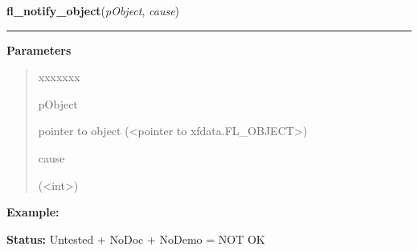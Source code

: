     \label{xformslib:library:fl_notify_object}

    \vspace{0.5ex}

\hspace{.8\funcindent}\begin{boxedminipage}{\funcwidth}

    \raggedright \textbf{fl\_notify\_object}(\textit{pObject}, \textit{cause})

    \vspace{-1.5ex}

    \rule{\textwidth}{0.5\fboxrule}
\setlength{\parskip}{2ex}
\setlength{\parskip}{1ex}
      \textbf{Parameters}
      \vspace{-1ex}

      \begin{quote}
        \begin{Ventry}{xxxxxxx}

          \item[pObject]

          pointer to object ({\textless}pointer to 
          xfdata.FL\_OBJECT{\textgreater})

          \item[cause]

          ({\textless}int{\textgreater})

        \end{Ventry}

      \end{quote}

\textbf{Example:} 

\textbf{Status:} Untested + NoDoc + NoDemo = NOT OK



    \end{boxedminipage}

    \label{xformslib:library:fl_set_object_lalign}

    \vspace{0.5ex}

